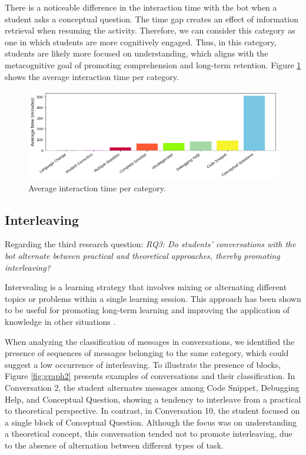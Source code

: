 \documentclass[a4paper,twoside]{article}
\begin{document}
There is a noticeable difference in the interaction time with the bot when a
student asks a conceptual question. The time gap creates an effect of
information retrieval when resuming the activity. Therefore, we can consider
this category as one in which students are more cognitively engaged. Thus, in
this category, students are likely more focused on understanding, which aligns
with the metacognitive goal of promoting comprehension and long-term retention.
Figure \ref{fig:graph3} shows the average interaction time per category.

\begin{figure}[htbp]
  \centering
  \includegraphics[scale=0.55]{img/figure3.png}
  \caption{Average interaction time per category.}
  \label{fig:graph3}
\end{figure}

\subsection{Interleaving}


Regarding the third research question: \textit{RQ3: Do students' conversations
with the bot alternate between practical and theoretical approaches, thereby
promoting interleaving?}

Intervealing is a learning strategy that involves mixing or alternating
different topics or problems within a single learning session. This approach has
been shown to be useful for promoting long-term learning and improving the
application of knowledge in other situations \citep{Rivers21}.

When analyzing the classification of messages in conversations, we identified
the presence of sequences of messages belonging to the same category, which
could suggest a low occurrence of interleaving. To illustrate the presence of
blocks, Figure \ref{fig:graph2} presents examples of conversations and their
classification. In Conversation 2, the student alternates messages among Code
Snippet, Debugging Help, and Conceptual Question, showing a tendency to
interleave from a practical to theoretical perspective. In contrast, in
Conversation 10, the student focused on a single block of Conceptual Question.
Although the focus was on understanding a theoretical concept, this conversation
tended not to promote interleaving, due to the absence of alternation between
different types of task.
\end{document}
